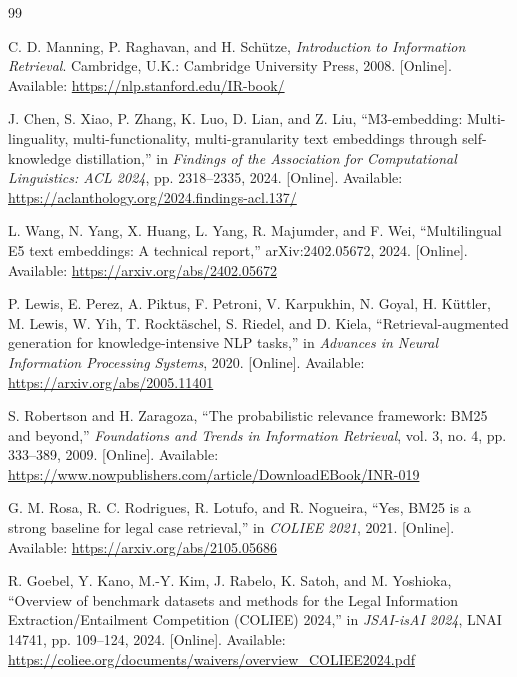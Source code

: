 \begin{thebibliography}{99}


C. D. Manning, P. Raghavan, and H. Schütze, \emph{Introduction to Information Retrieval}. Cambridge, U.K.: Cambridge University Press, 2008. [Online]. Available: \href{https://nlp.stanford.edu/IR-book/}{https://nlp.stanford.edu/IR-book/}

J. Chen, S. Xiao, P. Zhang, K. Luo, D. Lian, and Z. Liu, ``M3-embedding: Multi-linguality, multi-functionality, multi-granularity text embeddings through self-knowledge distillation,'' in \emph{Findings of the Association for Computational Linguistics: ACL 2024}, pp. 2318--2335, 2024. [Online]. Available: \href{https://aclanthology.org/2024.findings-acl.137/}{https://aclanthology.org/2024.findings-acl.137/}

L. Wang, N. Yang, X. Huang, L. Yang, R. Majumder, and F. Wei, ``Multilingual E5 text embeddings: A technical report,'' arXiv:2402.05672, 2024. [Online]. Available: \href{https://arxiv.org/abs/2402.05672}{https://arxiv.org/abs/2402.05672}

P. Lewis, E. Perez, A. Piktus, F. Petroni, V. Karpukhin, N. Goyal, H. Küttler, M. Lewis, W. Yih, T. Rocktäschel, S. Riedel, and D. Kiela, ``Retrieval-augmented generation for knowledge-intensive NLP tasks,'' in \emph{Advances in Neural Information Processing Systems}, 2020. [Online]. Available: \href{https://arxiv.org/abs/2005.11401}{https://arxiv.org/abs/2005.11401}

S. Robertson and H. Zaragoza, ``The probabilistic relevance framework: BM25 and beyond,'' \emph{Foundations and Trends in Information Retrieval}, vol. 3, no. 4, pp. 333--389, 2009. [Online]. Available: \href{https://www.nowpublishers.com/article/DownloadEBook/INR-019}{https://www.nowpublishers.com/article/DownloadEBook/INR-019}

G. M. Rosa, R. C. Rodrigues, R. Lotufo, and R. Nogueira, ``Yes, BM25 is a strong baseline for legal case retrieval,'' in \emph{COLIEE 2021}, 2021. [Online]. Available: \href{https://arxiv.org/abs/2105.05686}{https://arxiv.org/abs/2105.05686}

R. Goebel, Y. Kano, M.-Y. Kim, J. Rabelo, K. Satoh, and M. Yoshioka, ``Overview of benchmark datasets and methods for the Legal Information Extraction/Entailment Competition (COLIEE) 2024,'' in \emph{JSAI-isAI 2024}, LNAI 14741, pp. 109--124, 2024. [Online]. Available: \href{https://coliee.org/documents/waivers/overview_COLIEE2024.pdf}{https://coliee.org/documents/waivers/overview\_COLIEE2024.pdf}


\end{thebibliography}
